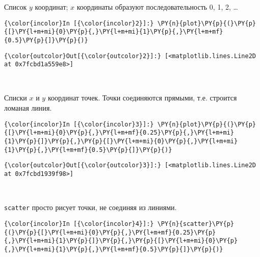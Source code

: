     Список \(y\) координат; \(x\) координаты образуют последовательность 0,
1, 2, \ldots{}

    \begin{Verbatim}[commandchars=\\\{\}]
{\color{incolor}In [{\color{incolor}2}]:} \PY{n}{plot}\PY{p}{(}\PY{p}{[}\PY{l+m+mi}{0}\PY{p}{,}\PY{l+m+mi}{1}\PY{p}{,}\PY{l+m+mf}{0.5}\PY{p}{]}\PY{p}{)}
\end{Verbatim}

            \begin{Verbatim}[commandchars=\\\{\}]
{\color{outcolor}Out[{\color{outcolor}2}]:} [<matplotlib.lines.Line2D at 0x7fcbd1a559e8>]
\end{Verbatim}
        
    \begin{center}
    \end{center}
    { \hspace*{\fill} \\}
    
    Списки \(x\) и \(y\) координат точек. Точки соединяются прямыми, т.е.
строится ломаная линия.

    \begin{Verbatim}[commandchars=\\\{\}]
{\color{incolor}In [{\color{incolor}3}]:} \PY{n}{plot}\PY{p}{(}\PY{p}{[}\PY{l+m+mi}{0}\PY{p}{,}\PY{l+m+mf}{0.25}\PY{p}{,}\PY{l+m+mi}{1}\PY{p}{]}\PY{p}{,}\PY{p}{[}\PY{l+m+mi}{0}\PY{p}{,}\PY{l+m+mi}{1}\PY{p}{,}\PY{l+m+mf}{0.5}\PY{p}{]}\PY{p}{)}
\end{Verbatim}

            \begin{Verbatim}[commandchars=\\\{\}]
{\color{outcolor}Out[{\color{outcolor}3}]:} [<matplotlib.lines.Line2D at 0x7fcbd1939f98>]
\end{Verbatim}
        
    \begin{center}
    \end{center}
    { \hspace*{\fill} \\}
    
    \texttt{scatter} просто рисует точки, не соединяя из линиями.

    \begin{Verbatim}[commandchars=\\\{\}]
{\color{incolor}In [{\color{incolor}4}]:} \PY{n}{scatter}\PY{p}{(}\PY{p}{[}\PY{l+m+mi}{0}\PY{p}{,}\PY{l+m+mf}{0.25}\PY{p}{,}\PY{l+m+mi}{1}\PY{p}{]}\PY{p}{,}\PY{p}{[}\PY{l+m+mi}{0}\PY{p}{,}\PY{l+m+mi}{1}\PY{p}{,}\PY{l+m+mf}{0.5}\PY{p}{]}\PY{p}{)}
\end{Verbatim}

